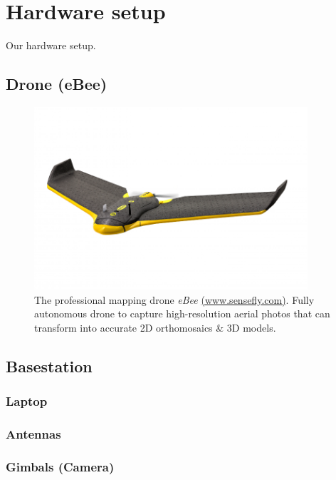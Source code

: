 \chapter{Hardware setup}\label{ch:hardwaresetup}
Our hardware setup.

\section{Drone (eBee)}
\begin{figure}[hb]
  \centering
  \includegraphics[width=4in]{figures/eBee.png}
  \caption[The professional mapping drone eBee]
   {The professional mapping drone \textit{eBee} \href{https://www.sensefly.com/drones/ebee.html}{(www.sensefly.com)}. Fully autonomous drone to capture high-resolution aerial photos that can transform into accurate 2D orthomosaics \& 3D models.}
\end{figure}
\section{Basestation}
\subsection{Laptop}
\subsection{Antennas}
\subsection{Gimbals (Camera)}